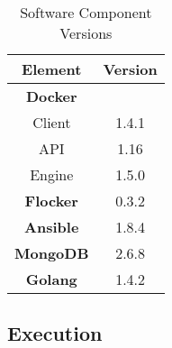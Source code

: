 \documentclass{article}
\begin{document}
\begin{table}[h]
    \centering
    \begin{tabular}{|c|c|}
    \hline
        Element & Version \\ \hline
        \textbf{Docker} & \\ \hline
        Client & 1.4.1 \\ \hline
        API & 1.16 \\ \hline
        Engine & 1.5.0 \\ \hline
        \textbf{Flocker} & 0.3.2\\ \hline
        \textbf{Ansible} & 1.8.4 \\ \hline
        \textbf{MongoDB} & 2.6.8 \\ \hline
        \textbf{Golang} & 1.4.2 \\ \hline
    \end{tabular}
    \caption{Software Component Versions}
    \label{tab:versions}
\end{table}


\subsection{Execution}
\end{document}
